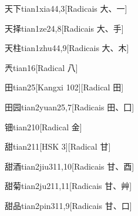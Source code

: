 \begin{entry}{天下}{tian1xia4}{4,3}[Radicais ⼤、⼀]
\end{entry}

\begin{entry}{天择}{tian1ze2}{4,8}[Radicais ⼤、⼿]
\end{entry}

\begin{entry}{天柱}{tian1zhu4}{4,9}[Radicais ⼤、⽊]
\end{entry}

\begin{entry}{兲}{tian1}{6}[Radical ⼋]
\end{entry}

\begin{entry}{田}{tian2}{5}[Kangxi 102][Radical ⽥]
\end{entry}

\begin{entry}{田园}{tian2yuan2}{5,7}[Radicais ⽥、⼞]
\end{entry}

\begin{entry}{钿}{tian2}{10}[Radical ⾦]
\end{entry}

\begin{entry}{甜}{tian2}{11}[HSK 3][Radical ⽢]
\end{entry}

\begin{entry}{甜酒}{tian2jiu3}{11,10}[Radicais ⽢、⾣]
\end{entry}

\begin{entry}{甜菊}{tian2ju2}{11,11}[Radicais ⽢、⾋]
\end{entry}

\begin{entry}{甜品}{tian2pin3}{11,9}[Radicais ⽢、⼝]
\end{entry}

